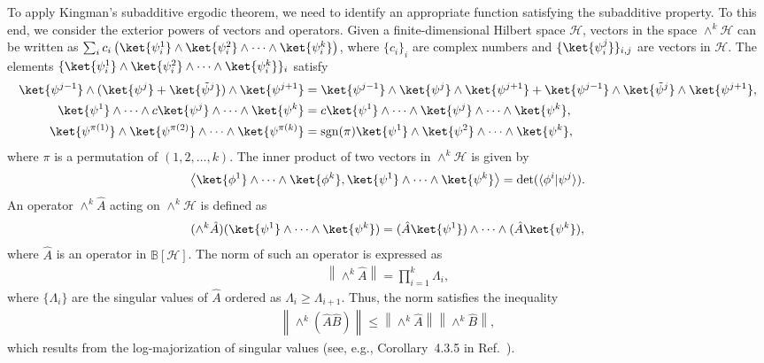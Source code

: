 \documentclass[preprint,pteplogo]{ptephy_v2}%
\numberwithin{equation}{section}
\theoremstyle{definition}
\begin{document}
To apply Kingman's subadditive ergodic theorem, we need to identify an appropriate function satisfying the subadditive property.
To this end, we consider the exterior powers of vectors and operators. 
Given a finite-dimensional Hilbert space $\mathcal{H}$, vectors in the space $\land^k\mathcal{H}$ can be written as $\sum_ic_i\left(\ket{\psi_i^1}\land\ket{\psi_i^2}\land\cdots\land\ket{\psi_i^k}\right)$, where $\{c_i\}_i$ are complex numbers and $\{\ket{\psi_i^j}\}_{i,j}$ are vectors in $\mathcal{H}$. 
The elements $\{\ket{\psi_i^1}\land\ket{\psi_i^2}\land\cdots\land\ket{\psi_i^k}\}_i$ satisfy
\begin{align}
    \ket{\psi^{j-1}}\land(\ket{\psi^j}+\ket{\tilde{\psi}^j})\land\ket{\psi^{j+1}}
    &=\ket{\psi^{j-1}}\land\ket{\psi^j}\land\ket{\psi^{j+1}}
    +\ket{\psi^{j-1}}\land\ket{\tilde{\psi}^j}\land\ket{\psi^{j+1}},\\
    \ket{\psi^1}\land\cdots\land c\ket{\psi^j}\land\cdots\land\ket{\psi^k}
    &=c\ket{\psi^1}\land\cdots\land\ket{\psi^j}\land\cdots\land\ket{\psi^k},\\
    \ket{\psi^{\pi(1)}}\land\ket{\psi^{\pi(2)}}\land\cdots\land\ket{\psi^{\pi(k)}}
    &=\mathrm{sgn}(\pi)\ket{\psi^1}\land\ket{\psi^2}\land\cdots\land\ket{\psi^k},
\end{align}
where $\pi$ is a permutation of $(1,2,\ldots,k)$. 
The inner product of two vectors in $\land^k\mathcal{H}$ is given by
\begin{align}
    \left<\ket{\phi^1}\land\cdots\land\ket{\phi^k},\ket{\psi^1}\land\cdots\land\ket{\psi^k}\right>
    =\det(\langle\phi^i|\psi^j\rangle).
\end{align}
An operator $\land^k\hat{A}$ acting on $\land^k\mathcal{H}$ is defined as
\begin{align}
    (\land^k\hat{A})(\ket{\psi^1}\land\cdots\land\ket{\psi^k})
    =(\hat{A}\ket{\psi^1})\land\cdots\land (\hat{A}\ket{\psi^k}),
\end{align}
where $\hat{A}$ is an operator in $\mathbb{B}[\mathcal{H}]$. 
The norm of such an operator is expressed as
\begin{align}
    \left\|\land^k\hat{A}\right\|=\prod_{i=1}^k\Lambda_i,
    \label{eq:norm_exterior-power}
\end{align}
where $\{\Lambda_i\}$ are the singular values of $\hat{A}$ ordered as $\Lambda_i\geq\Lambda_{i+1}$. 
Thus, the norm satisfies the inequality
\begin{align}
    \left\|\land^k(\hat{A}\hat{B})\right\|\leq
    \left\|\land^k\hat{A}\right\|\left\|\land^k\hat{B}\right\|,
    \label{eq:norm-inequality_exterior-power}
\end{align}
which results from the log-majorization of singular values (see, e.g., Corollary~4.3.5 in Ref.~\cite{hiai2010matrix}). 
\end{document}
